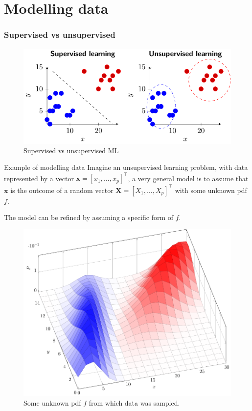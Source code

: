 \documentclass{beamer}
\begin{document}
\section{Modelling data}


\begin{frame}
  \frametitle{Supervised vs unsupervised}
    
    \begin{figure}
      \includegraphics{supervised_unsupervised}
      \caption{Supervised vs unsupervised ML}
      \label{fig:supunsup}
    \end{figure}
  
  \end{frame}

\begin{frame}[allowframebreaks]{Example of modelling data}
  \label{sld:model}
  Imagine an unsupervised learning problem, with data represented by a vector $\bm{x}=[x_1,\ldots,x_p]^\intercal$, a very general model is to assume that $\bm{x}$ is the outcome of a random vector $\bm{X}=[X_1,\ldots,X_p]^\intercal$ with some unknown pdf $f$.

  The model can be refined by assuming a specific form of $f$.

  \begin{figure}
    \includegraphics[width=0.5\linewidth]{2dbivariate}
    \caption{Some unknown pdf $f$ from which data was sampled.}
    \label{fig:supunsup}
  \end{figure}
\end{frame}
\end{document}
